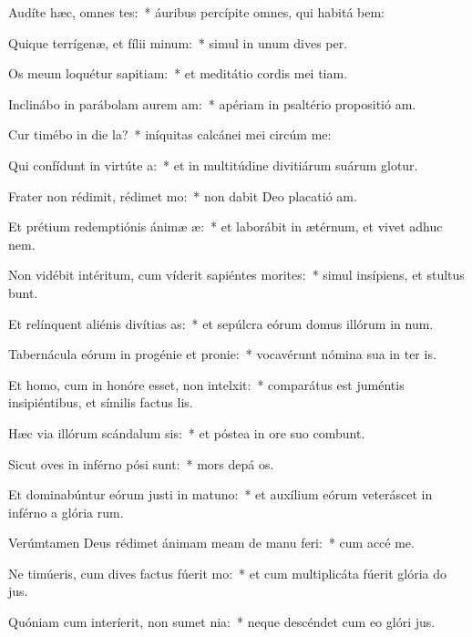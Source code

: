 \item Audíte hæc, omnes tes:~* áuribus percípite omnes, qui habitá bem:
\item Quique terrígenæ, et fílii minum:~* simul in unum dives  per.
\item Os meum loquétur sapitiam:~* et meditátio cordis mei tiam.
\item Inclinábo in parábolam aurem am:~* apériam in psaltério propositió am.
\item Cur timébo in die la?~* iníquitas calcánei mei circúm me:
\item Qui confídunt in virtúte a:~* et in multitúdine divitiárum suárum glotur.
\item Frater non rédimit, rédimet mo:~* non dabit Deo placatió am.
\item Et prétium redemptiónis ánimæ æ:~* et laborábit in ætérnum, et vivet adhuc  nem.
\item Non vidébit intéritum, cum víderit sapiéntes morites:~* simul insípiens, et stultus bunt.
\item Et relínquent aliénis divítias as:~* et sepúlcra eórum domus illórum in num.
\item Tabernácula eórum in progénie et pronie:~* vocavérunt nómina sua in ter is.
\item Et homo, cum in honóre esset, non intelxit:~* comparátus est juméntis insipiéntibus, et símilis factus  lis.
\item Hæc via illórum scándalum sis:~* et póstea in ore suo combunt.
\item Sicut oves in inférno pósi sunt:~* mors depá os.
\item Et dominabúntur eórum justi in matuno:~* et auxílium eórum veteráscet in inférno a glória rum.
\item Verúmtamen Deus rédimet ánimam meam de manu feri:~* cum accé me.
\item Ne timúeris, cum dives factus fúerit mo:~* et cum multiplicáta fúerit glória do jus.
\item Quóniam cum interíerit, non sumet nia:~* neque descéndet cum eo glóri jus.
